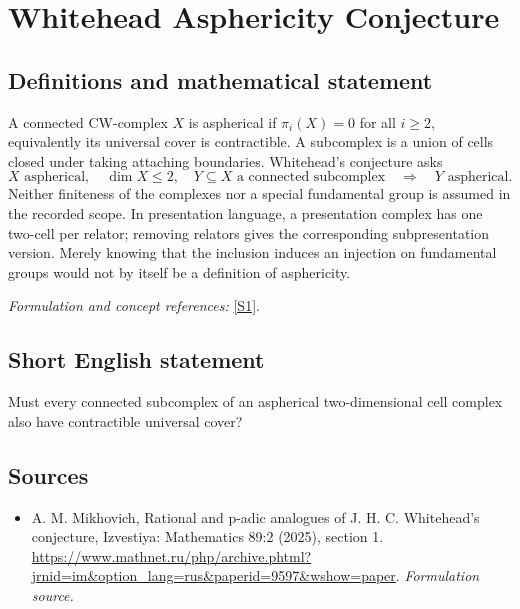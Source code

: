 \documentclass[11pt]{article}
\begin{document}
\section*{\texorpdfstring{Whitehead Asphericity Conjecture}{Whitehead Asphericity Conjecture}}\label{397}
\subsection{Definitions and mathematical statement}
A connected CW-complex $X$ is aspherical if $\pi_i(X)=0$ for all $i\ge2$, equivalently its universal cover is contractible. A subcomplex is a union of cells closed under taking attaching boundaries. Whitehead's conjecture asks
\[
 X\text{ aspherical},\quad\dim X\le2,\quad
 Y\subseteq X\text{ a connected subcomplex}
 \quad\Longrightarrow\quad Y\text{ aspherical}.
\]
Neither finiteness of the complexes nor a special fundamental group is assumed in the recorded scope. In presentation language, a presentation complex has one two-cell per relator; removing relators gives the corresponding subpresentation version. Merely knowing that the inclusion induces an injection on fundamental groups would not by itself be a definition of asphericity.
\par\smallskip\textit{Formulation and concept references:} \href{https://www.mathnet.ru/php/archive.phtml?jrnid=im&option_lang=rus&paperid=9597&wshow=paper}{[S1]}.

\subsection{Short English statement}
Must every connected subcomplex of an aspherical two-dimensional cell complex also have contractible universal cover?
\subsection{Sources}
\begin{itemize}
\item[S1]A. M. Mikhovich, Rational and p-adic analogues of J. H. C. Whitehead's conjecture, Izvestiya: Mathematics 89:2 (2025), section 1.
\url{https://www.mathnet.ru/php/archive.phtml?jrnid=im&option_lang=rus&paperid=9597&wshow=paper}.
\textit{Formulation source.}
\end{itemize}
\end{document}
